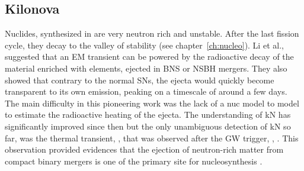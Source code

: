 


\subsection{Kilonova}

Nuclides, synthesized in \rproc{} are very neutron rich and unstable. After the last 
fission cycle, they decay to the valley of stability (see chapter~\ref{ch:nucleo}). 
%
%
%
Li et al., \citep{Li:1998bw} suggested that an \ac{EM} transient can be powered by the radioactive 
decay of the material enriched with \rproc{} elements, ejected in \ac{BNS} or \ac{NSBH} mergers. 
They also showed that contrary to the normal \acp{SN}, the ejecta would quickly become transparent 
to its own emission, peaking on a timescale of around a few days. The main difficulty in this 
pioneering work was the lack of a \ac{nuc} model to model to estimate the radioactive heating of the 
ejecta. 
%
The understanding of \ac{kN} has significantly improved since then
\citep[\eg][]{Kulkarni:2005jw,Metzger:2010,Roberts:2011,Metzger:2016pju,Wollaeger:2017ahm}
%
but the only unambiguous detection of \ac{kN} so far, was the thermal transient, \AT{}, 
\citep{Coulter:2017wya,Chornock:2017sdf,Nicholl:2017ahq,Cowperthwaite:2017dyu,Tanvir:2017pws,Tanaka:2017qxj}
that was observed after the \ac{GW} trigger, \GW{}, 
\citep{TheLIGOScientific:2017qsa,Abbott:2018wiz,LIGOScientific:2018mvr}.
%
This observation provided evidences that the ejection of neutron-rich matter from compact 
binary mergers is one of the primary site for \rproc{} nucleosynthesis 
\citep{Arcavi:2017xiz,Coulter:2017wya,Drout:2017ijr,Evans:2017mmy,Hallinan:2017woc,Kasliwal:2017ngb,
    Nicholl:2017ahq,Smartt:2017fuw,Soares-santos:2017lru,Tanvir:2017pws,
    Troja:2017nqp,Mooley:2018dlz,Ruan:2017bha,Lyman:2018qjg}. 
